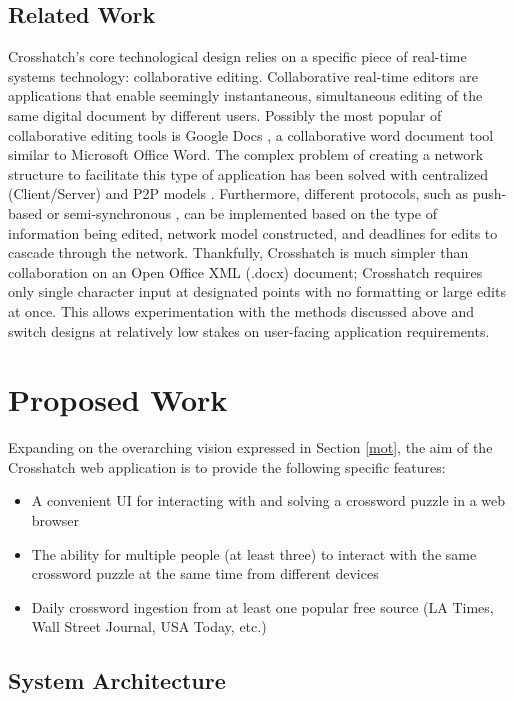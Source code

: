 \documentclass{article}
\begin{document}
\subsection{Related Work}
Crosshatch's core technological design relies on a specific piece of real-time systems technology: collaborative editing.
Collaborative real-time editors are applications that enable seemingly instantaneous, simultaneous editing 
of the same digital document by different users.
Possibly the most popular of collaborative editing tools is Google Docs \cite{googledocs}, a collaborative
word document tool similar to Microsoft Office Word.
The complex problem of creating a network structure to facilitate this type of application has been solved with centralized (Client/Server)
and P2P models \cite{p2p} \cite{p2p2}.
Furthermore, different protocols, such as push-based \cite{pushbased} or semi-synchronous \cite{semisynchronous}, can be implemented based on the type of information being edited,
network model constructed, and deadlines for edits to cascade through the network.
Thankfully, Crosshatch is much simpler than collaboration on an Open Office XML (.docx) document; Crosshatch requires only
single character input at designated points with no formatting or large edits at once. 
This allows experimentation with the methods discussed above and switch designs
at relatively low stakes on user-facing application requirements.

\section{Proposed Work}
Expanding on the overarching vision expressed in Section \ref{mot}, the aim of the Crosshatch web application is to provide the following
specific features:
\begin{itemize}
  \item A convenient UI for interacting with and solving a crossword puzzle in a web browser
  \item The ability for multiple people (at least three) to interact with the same crossword puzzle at the same time from different devices
  \item Daily crossword ingestion from at least one popular free source (LA Times, Wall Street Journal, USA Today, etc.)
\end{itemize}

\subsection{System Architecture}
\end{document}
